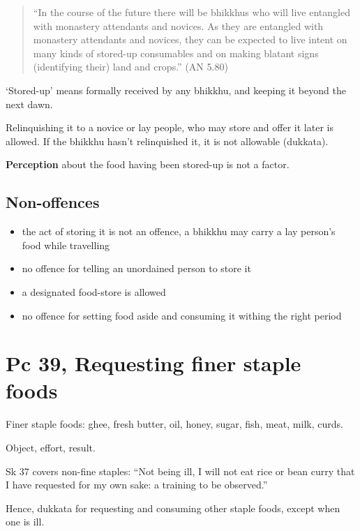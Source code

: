 \begin{quote}
``In the course of the future there will be bhikkhus who will live
entangled with monastery attendants and novices. As they are entangled
with monastery attendants and novices, they can be expected to live
intent on many kinds of stored-up consumables and on making blatant
signs (identifying their) land and crops.'' (AN 5.80)
\end{quote}

`Stored-up' means formally received by any bhikkhu, and keeping it
beyond the next dawn.

Relinquishing it to a novice or lay people, who may store and offer it
later is allowed. If the bhikkhu hasn't relinquished it, it is not
allowable (dukkata).

\textbf{Perception} about the food having been stored-up is not a
factor.

\subsection{Non-offences}

\vspace*{-0.5\baselineskip}
\enlargethispage*{2\baselineskip}

\begin{itemize}
\tightlist
\item
  the act of storing it is not an offence, a bhikkhu may carry a lay
  person's food while travelling
\item
  no offence for telling an unordained person to store it
\item
  a designated food-store is allowed
\item
  no offence for setting food aside and consuming it withing the right
  period
\end{itemize}

\clearpage

\section{Pc 39, Requesting finer staple foods}

Finer staple foods: ghee, fresh butter, oil, honey, sugar, fish, meat,
milk, curds.

Object, effort, result.

Sk 37 covers non-fine staples: ``Not being ill, I will not eat rice or
bean curry that I have requested for my own sake: a training to be
observed.''

Hence, dukkata for requesting and consuming other staple foods, except
when one is ill.


